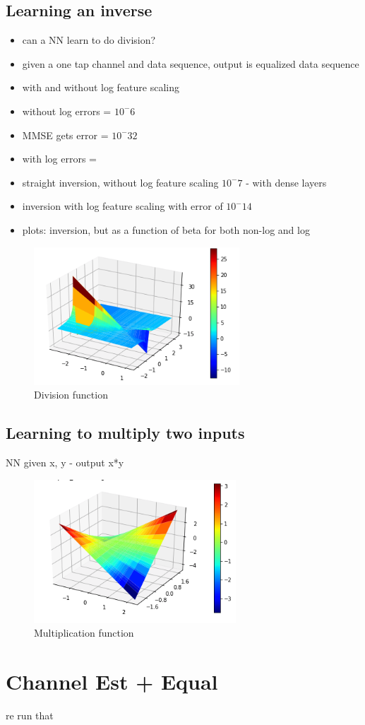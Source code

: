 \subsection{Learning an inverse}
\begin{itemize}
\item can a NN learn to do division?
\item given a one tap channel and data sequence, output is equalized data sequence
\item with and without log feature scaling
\item without log errors = $10^-6$
\item MMSE gets error = $10^-32$
\item with log errors = 
\item straight inversion, without log feature scaling $10^-7$ - with dense layers
\item inversion with log feature scaling with error of $10^-14$ 
\item plots: inversion, but as a function of beta for both non-log and log
\end{itemize}

\begin{figure}
\begin{center}
\includegraphics{figures/plot_of_division_function.png}
\caption{Division function}
\end{center}
\label{fig:div_fx}
\end{figure}

\subsection{Learning to multiply two inputs}
NN given x, y - output x*y

\begin{figure}
\begin{center}
\includegraphics{figures/plot_of_multiplication_func.png}
\caption{Multiplication function}
\end{center}
\label{fig:mult_fx}
\end{figure}

\section{Channel Est + Equal}
re run that 